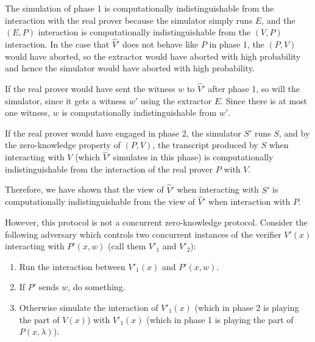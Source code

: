 \documentclass[draft]{article}
\begin{document}
\begin{enumerate}
\begin{description}
    The simulation of phase 1 is computationally indistinguishable from the interaction with the real prover because the simulator simply runs $E$, and the $(E, P)$ interaction is computationally indistinguishable from the $(V, P)$ interaction.
    In the case that $\hat{V}'$ does not behave like $P$ in phase 1, the $(P, V)$ would have aborted, so the extractor would have aborted with high probability and hence the simulator would have aborted with high probability.

    If the real prover would have sent the witness $w$ to $\hat{V}'$ after phase 1, so will the simulator, since it gets a witness $w'$ using the extractor $E$.
    Since there is at most one witness, $w$ is computationally indistinguishable from $w'$.
    
    If the real prover would have engaged in phase 2, the simulator $S'$ runs $S$, and by the zero-knowledge property of $(P, V)$, the transcript produced by $S$ when interacting with $V$ (which $\hat{V}'$ simulates in this phase) is computationally indistinguishable from the interaction of the real prover $P$ with $V$.

    Therefore, we have shown that the view of $\hat{V}'$ when interacting with $S'$ is computationally indistinguishable from the view of $\hat{V}'$ when interaction with $P$.
  \end{description}

  However, this protocol is not a concurrent zero-knowledge protocol.
  Consider the following adversary which controls two concurrent instances of the verifier $V'(x)$ interacting with $P'(x, w)$ (call them $V'_1$ and $V'_2$):
  \begin{enumerate}
  \item Run the interaction between $V'_1(x)$ and $P'(x, w)$.
  \item If $P'$ sends $w$, do something.
  \item Otherwise simulate the interaction of $V'_1(x)$ (which in phase 2 is playing the part of $V(x)$) with $V'_1(x)$ (which in phase 1 is playing the part of $P(x, \lambda)$).
  \end{enumerate}
\end{enumerate}
\end{document}
